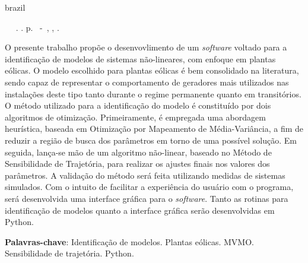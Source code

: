 \setlength{\absparsep}{18pt} %

\begin{resumo}[Resumo]

\begin{otherlanguage*}{brazil}

\begin{flushleft} 
	\setlength{\absparsep}{0pt} %
	\SingleSpacing 
	\imprimirautorabr~ ~\textbf{\imprimirtitulo}.	\imprimirdata. \pageref{LastPage}p. 
	\imprimirtipotrabalho~-~\imprimirinstituicao, \imprimirlocal, \imprimirdata. 
\end{flushleft}

\OnehalfSpacing 			

O presente trabalho prop\~oe o desenvovlimento de um \textit{software} voltado para a identifica\c{c}\~ao de modelos de sistemas n\~ao-lineares, com enfoque em plantas e\'olicas. O modelo escolhido para plantas e\'olicas \'e bem consolidado na literatura, sendo capaz de representar o comportamento de geradores mais utilizados nas instala\c{c}\~oes deste tipo tanto durante o regime permanente quanto em transit\'orios. O m\'etodo utilizado para a identifica\c{c}\~ao do modelo \'e constitu\'ido por dois algoritmos de otimiza\c{c}\~ao. Primeiramente, \'e empregada uma abordagem heur\'istica, baseada em Otimiza\c{c}\~ao por Mapeamento de M\'edia-Vari\^ancia, a fim de reduzir a regi\~ao de busca dos par\^ametros em torno de uma poss\'ivel solu\c{c}\~ao. Em seguida, lan\c{c}a-se m\~ao de um algoritmo n\~ao-linear, baseado no M\'etodo de Sensibilidade de Trajet\'oria, para realizar os ajustes finais nos valores dos par\^ametros. A valida\c{c}\~ao do m\'etodo ser\'a feita utilizando medidas de sistemas simulados. Com o intuito de facilitar a experi\^encia do usu\'ario com o programa, ser\'a desenvolvida uma interface gr\'afica para o \textit{software}. Tanto as rotinas para identifica\c{c}\~ao de modelos quanto a interface gr\'afica ser\~ao desenvolvidas em Python.
 

\textbf{Palavras-chave}: Identifica\c{c}\~ao de modelos. Plantas e\'olicas. MVMO. Sensibilidade de trajet\'oria. Python.

\end{otherlanguage*}

\end{resumo}